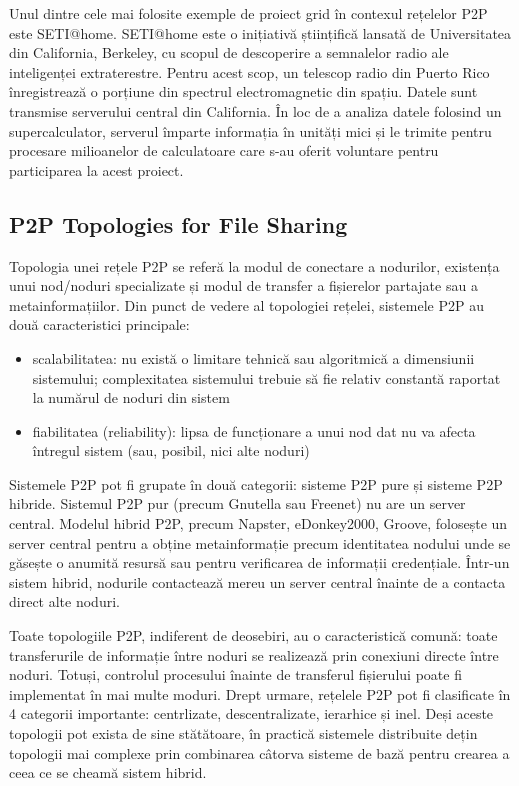 Unul dintre cele mai folosite exemple de proiect grid în contexul rețelelor
P2P este SETI@home. SETI@home este o inițiativă științifică lansată de
Universitatea din California, Berkeley, cu scopul de descoperire a semnalelor
radio ale inteligenței extraterestre. Pentru acest scop, un telescop radio din
Puerto Rico înregistrează o porțiune din spectrul electromagnetic din spațiu.
Datele sunt transmise serverului central din California. În loc de a analiza
datele folosind un supercalculator, serverul împarte informația în unități
mici și le trimite pentru procesare milioanelor de calculatoare care s-au
oferit voluntare pentru participarea la acest proiect.

\subsection{P2P Topologies for File Sharing}

Topologia unei rețele P2P se referă la modul de conectare a nodurilor,
existența unui nod/noduri specializate și modul de transfer a fișierelor
partajate sau a metainformațiilor. Din punct de vedere al topologiei rețelei,
sistemele P2P au două caracteristici principale:

\begin{itemize}
  \item scalabilitatea: nu există o limitare tehnică sau algoritmică a
  dimensiunii sistemului; complexitatea sistemului trebuie să fie relativ
  constantă raportat la numărul de noduri din sistem
  \item fiabilitatea (reliability): lipsa de funcționare a unui nod dat nu va
  afecta întregul sistem (sau, posibil, nici alte noduri)
\end{itemize}

Sistemele P2P pot fi grupate în două categorii: sisteme P2P pure și sisteme
P2P hibride. Sistemul P2P pur (precum Gnutella sau Freenet) nu are un server
central. Modelul hibrid P2P, precum Napster, eDonkey2000, Groove, folosește un
server central pentru a obține metainformație precum identitatea nodului unde
se găsește o anumită resursă sau pentru verificarea de informații credențiale.
Într-un sistem hibrid, nodurile contactează mereu un server central înainte de
a contacta direct alte noduri.

Toate topologiile P2P, indiferent de deosebiri, au o caracteristică comună:
toate transferurile de informație între noduri se realizează prin conexiuni
directe între noduri. Totuși, controlul procesului înainte de transferul
fișierului poate fi implementat în mai multe moduri. Drept urmare, rețelele
P2P pot fi clasificate în 4 categorii importante: centrlizate,
descentralizate, ierarhice și inel. Deși aceste topologii pot exista de sine
stătătoare, în practică sistemele distribuite dețin topologii mai complexe
prin combinarea câtorva sisteme de bază pentru crearea a ceea ce se cheamă
sistem hibrid.

